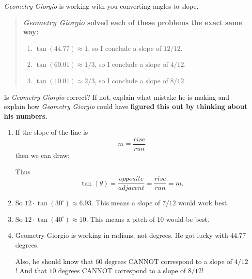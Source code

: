 \documentclass[noauthor,nooutcomes,hints,handout]{ximera}
\begin{document}
\begin{question}
 \textit{Geometry Giorgio} is working with you converting angles
  to slope.
  \begin{quote} \textbf{\textit{Geometry Giorgio} solved
      each of these problems the exact same way:}
        \begin{enumerate}
        \item $\tan(44.77) \approx 1$, so I conclude a slope of $12/12$.
        \item $\tan(60.01) \approx 1/3$, so I conclude a slope of $4/12$.
        \item $\tan(10.01) \approx 2/3$, so I conclude a slope of $8/12$.
        \end{enumerate}
  \end{quote}
  Is \textit{Geometry Giorgio} correct? If not, {explain what mistake
  he is making} and explain how \textit{Geometry Giorgio} could have
  \textbf{figured this out by thinking about his numbers.}
\begin{freeResponse}
  \begin{enumerate}
  \item If the slope of the line is
    \[
    m = \frac{rise}{run}
    \]
    then we can draw:
    \begin{center}
    \end{center}
    Thus
    \[
    \tan(\theta) =\frac{opposite}{adjacent} = \frac{rise}{run} = m.
    \]
  \item So $12\cdot \tan(30^\circ) \approx 6.93$. This means a slope
    of $7/12$ would work best.

  \item So $12\cdot \tan(40^\circ)\approx 10$. This means a pitch of
    $10$ would be best.
  \item Geometry Giorgio is working in radians, not degrees.
    He got lucky with $44.77$ degrees.

    Also, he should know that $60$ degrees CANNOT correspond to a
    slope of $4/12$! And  that $10$ degrees CANNOT correspond to a
    slope of $8/12$!
  \end{enumerate}
  \end{freeResponse}
\end{question}
\end{document}
